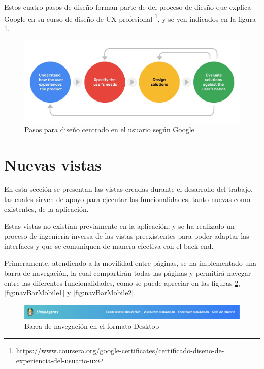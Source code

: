Estos cuatro pasos de diseño forman parte de del proceso de diesño que explica Google en su curso de diseño de UX profesional \footnote{\url{https://www.coursera.org/google-certificates/certificado-diseno-de-experiencia-del-usuario-ux}}, y se ven indicados en la figura \ref{fig:pasosDisenoUsuario}.

\begin{figure}[H]
	\centering
	\includegraphics[width = 1\textwidth]{Imagenes/Vectorial/pasos_DCU.png}
	\caption{Pasos para diseño centrado en el usuario según Google}
	\label{fig:pasosDisenoUsuario}
\end{figure}

\section{Nuevas vistas}

En esta sección se presentan las vistas creadas durante el desarrollo del trabajo, las cuales sirven de apoyo para ejecutar las funcionalidades, tanto nuevas como existentes, de la aplicación.

Estas vistas no existían previamente en la aplicación, y se ha realizado un proceso de ingeniería inversa de las vistas preexistentes para poder adaptar las interfaces y que se comuniquen de manera efectiva con el back end.

Primeramente, atendiendo a la movilidad entre páginas, se ha implementado una barra de navegación, la cual compartirán todas las páginas y permitirá navegar entre las diferentes funcionalidades, como se puede apreciar en las figuras \ref{fig:navBarDesktop}, \ref{fig:navBarMobile1} y \ref{fig:navBarMobile2}.

\begin{figure}[H]
	\centering
	\includegraphics[width = 1\textwidth]{Imagenes/Vectorial/navBarDesktop.png}
	\caption{Barra de navegación en el formato Desktop}
	\label{fig:navBarDesktop}
\end{figure}


